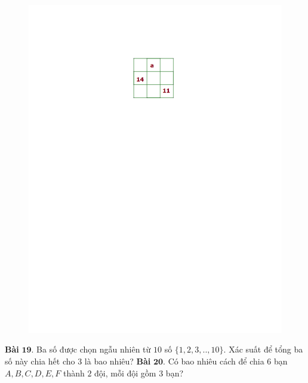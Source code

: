 \begin{multicols}{2}
\begin{figure}[H]
		\vspace*{-5pt}
		\centering
		\captionsetup{labelformat= empty, justification=centering}
		\includegraphics[width= 0.7\linewidth]{bai18k3}
		\vspace*{-10pt}
	\end{figure}
	\textbf{\color{toancuabi}Bài} $\pmb{19.}$  Ba số được chọn ngẫu nhiên từ $10$ số $\{1,2,3,..,10\}$. Xác suất để tổng ba số này chia hết cho $3$ là bao nhiêu?
	\vskip 0.1cm
	\textbf{\color{toancuabi}Bài} $\pmb{20.}$ Có bao nhiêu cách để chia $6$ bạn $A,B,C,D,E,F$ thành $2$ đội, mỗi đội gồm $3$ bạn?
\end{multicols}